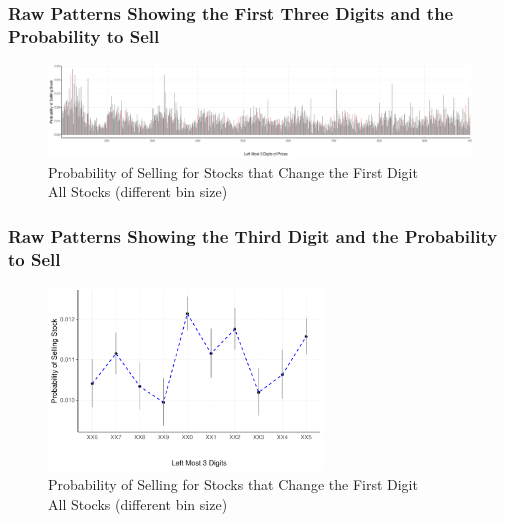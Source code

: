 \begin{landscape}

\subsubsection{Raw Patterns Showing the First Three Digits and the Probability to Sell}

\begin{figure}[hbt!]
	\centering%
	\caption{Probability of Selling  for Stocks that Change the First Digit \\ All Stocks (different bin size)}%
	\label{fig:all_obs}%
	\includegraphics[width=1.6\textwidth]{figures/3left_increase.pdf}
	\fignote{}
\end{figure}
\end{landscape}

\clearpage
\subsubsection{Raw Patterns Showing the Third Digit and the Probability to Sell}

\begin{figure}[hbt!]
	\centering%
	\caption{Probability of Selling  for Stocks that Change the First Digit \\ All Stocks (different bin size)}%
	\label{fig:}%
	\includegraphics[width=0.65\textwidth]{figures/Left3increase_probCI.pdf}
	\fignote{}
\end{figure}


